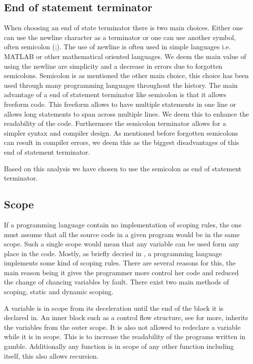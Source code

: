 \subsection*{End of statement terminator}
When choosing an end of state terminator there is two main choices.
Either one can use the newline character as a terminator or one can use another symbol, often semicolon (;).
The use of newline is often used in simple languages i.e. MATLAB or other mathematical oriented languages. 
We deem the main value of using the newline are simplicity and a decrease in errors due to forgotten semicolons.
Semicolon is as mentioned the other main choice, this choice has been used through many programming languages throughout the history. 
The main advantage of a end of statement terminator  like semicolon is that it allows freeform code. 
This freeform allows to have multiple statements in one line or allows long statements to span across multiple lines.
We deem this to enhance the readability of the code.
Furthermore the semicolon terminator allows for a simpler syntax and compiler design.
As mentioned before forgotten semicolons can result in compiler errors, we deem this as the biggest disadvantages of this end of statement terminator.

Based on this analysis we have chosen to use the semicolon as end of statement terminator.

\subsection*{Scope}
If a programming language contain no implementation of scoping rules, the one must assume that all the source code in a given program would be in the same scope.
Such a single scope would mean that any variable can be used form any place in the code. 
Mostly, as briefly decried in , a programming language implements some kind of scoping rules.
There are several reasons for this, the main reason being it gives the programmer more control her code and reduced the change of chancing variables by fault.
There exist two main methods of scoping, static and dynamic scoping.

A variable is in scope from its deceleration until the end of the block it is declared in.
An inner block such as a control flow structure, see  for more, inherits the variables from the outer scope. 
It is also not allowed to redeclare a variable while it is in scope. 
This is to increase the readability of the programs written in \gls{gamble}.
Additionally any function is in scope of any other function including itself, this also allows recursion. 

